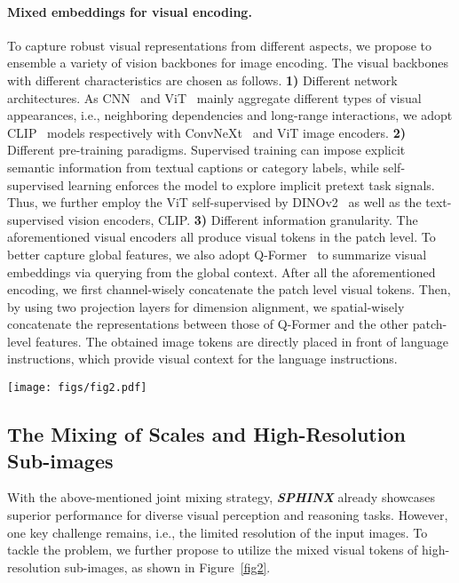 \documentclass{article} \usepackage{iclr2024_conference,times}
\begin{document}
\paragraph{Mixed embeddings for visual encoding.}
To capture robust visual representations from different aspects, we propose to ensemble a variety of vision backbones for image encoding. The visual backbones with different characteristics are chosen as follows. 
\textbf{1)} Different network architectures. As CNN~\citep{he2016deep} and ViT~\citep{dosovitskiy2020image} mainly aggregate different types of visual appearances, i.e., neighboring dependencies and long-range interactions, we adopt CLIP~\citep{radford2021learning} models respectively with ConvNeXt~\citep{woo2023convnext} and ViT image encoders.
\textbf{2)} Different pre-training paradigms. Supervised training can impose explicit semantic information from textual captions or category labels, while self-supervised learning enforces the model to explore implicit pretext task signals. Thus, we further employ the ViT self-supervised by DINOv2~\citep{oquab2023dinov2} as well as the text-supervised vision encoders, CLIP. 
\textbf{3)} Different information granularity. The aforementioned visual encoders all produce visual tokens in the patch level. To better capture global features, we also adopt Q-Former~\citep{li2023blip} to summarize visual embeddings via querying from the global context. After all the aforementioned encoding, we first channel-wisely concatenate the patch level visual tokens. Then, by using two projection layers for dimension alignment, we spatial-wisely concatenate the representations between those of Q-Former and the other patch-level features. The obtained image tokens are directly placed in front of language instructions, which provide visual context for the language instructions.

\begin{figure*}[t!]
  \centering
\texttt{[image: figs/fig2.pdf]}
   \caption{\textbf{Pipeline of \textcolor{Goldenrod3}{\textbf{\textit{SPHINX}}} for high-resolution images.} We propose to further mix different scales and sub-images to better capture fine-grained semantics on high-resolution images.}
    \label{fig2}
\end{figure*}

\subsection{The Mixing of Scales and High-Resolution Sub-images}
\label{s3.2}
With the above-mentioned joint mixing strategy, \textcolor{Goldenrod3}{\textbf{\textit{SPHINX}}} already showcases superior performance for diverse visual perception and reasoning tasks. However, one key challenge remains, i.e., the limited resolution of the input images. To tackle the problem, we further propose to utilize the mixed visual tokens of high-resolution sub-images, as shown in Figure~\ref{fig2}.
\end{document}
